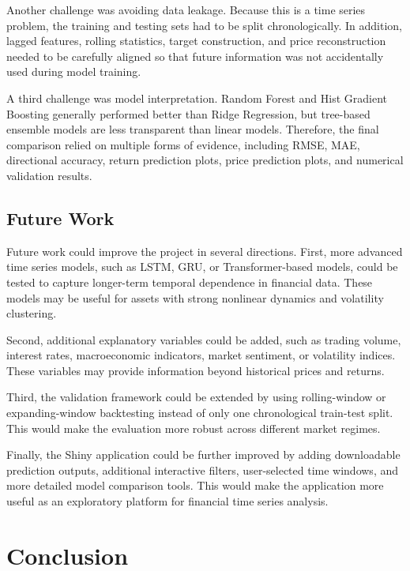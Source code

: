 \documentclass[12pt]{article}
\begin{document}
Another challenge was avoiding data leakage. Because this is a time series problem, the training and testing sets had to be split chronologically. In addition, lagged features, rolling statistics, target construction, and price reconstruction needed to be carefully aligned so that future information was not accidentally used during model training.

A third challenge was model interpretation. Random Forest and Hist Gradient Boosting generally performed better than Ridge Regression, but tree-based ensemble models are less transparent than linear models. Therefore, the final comparison relied on multiple forms of evidence, including RMSE, MAE, directional accuracy, return prediction plots, price prediction plots, and numerical validation results.

\subsection{Future Work}

Future work could improve the project in several directions. First, more advanced time series models, such as LSTM, GRU, or Transformer-based models, could be tested to capture longer-term temporal dependence in financial data. These models may be useful for assets with strong nonlinear dynamics and volatility clustering.

Second, additional explanatory variables could be added, such as trading volume, interest rates, macroeconomic indicators, market sentiment, or volatility indices. These variables may provide information beyond historical prices and returns.

Third, the validation framework could be extended by using rolling-window or expanding-window backtesting instead of only one chronological train-test split. This would make the evaluation more robust across different market regimes.

Finally, the Shiny application could be further improved by adding downloadable prediction outputs, additional interactive filters, user-selected time windows, and more detailed model comparison tools. This would make the application more useful as an exploratory platform for financial time series analysis.



\section{Conclusion}
\end{document}
